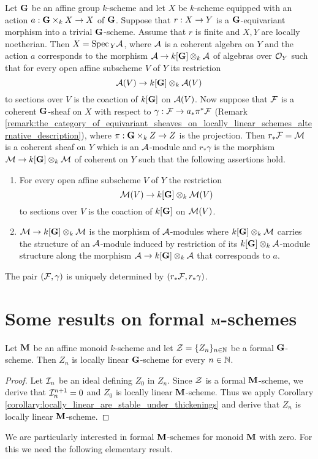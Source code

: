 \begin{remark}\label{remark:equivariant_scheme_affine_over_trivial_scheme}
Let $\mathbf{G}$ be an affine group $k$-scheme and let $X$ be $k$-scheme equipped with an action $a:\mathbf{G}\times_k X\rightarrow X$ of $\mathbf{G}$. Suppose that $r:X\rightarrow Y$ is a $\mathbf{G}$-equivariant morphism into a trivial $\mathbf{G}$-scheme. Assume that $r$ is finite and $X,Y$ are locally noetherian. Then $X = \mathrm{Spec}\,_Y{\mathcal A}$, where ${\mathcal A}$ is a coherent algebra on $Y$ and the action $a$ corresponds to the morphism ${\mathcal A}\rightarrow k[\mathbf{G}]\otimes_k{\mathcal A}$ of algebras over ${\mathcal O}_Y$ such that for every open affine subscheme $V$ of $Y$ its restriction
$${\mathcal A}(V) \rightarrow k[\mathbf{G}]\otimes_k{\mathcal A}(V)$$
to sections over $V$ is the coaction of $k[\mathbf{G}]$ on ${\mathcal A}(V)$. Now suppose that ${\mathcal F}$ is a coherent $\mathbf{G}$-sheaf on $X$ with respect to $\gamma:{\mathcal F}\rightarrow a_*\pi^*{\mathcal F}$ (Remark \ref{remark:the_category_of_equivariant_sheaves_on_locally_linear_schemes_alternative_description}), where $\pi:\mathbf{G}\times_kZ\rightarrow Z$ is the projection. Then $r_*{\mathcal F} = {\mathcal M}$ is a coherent sheaf on $Y$ which is an ${\mathcal A}$-module and $r_*\gamma$ is the morphism ${\mathcal M}\rightarrow k[\mathbf{G}]\otimes_k{\mathcal M}$ of coherent on $Y$ such that the following assertions hold.
\begin{enumerate}[label=\textbf{(\arabic*)}, leftmargin=3.0em]
\item For every open affine subscheme $V$ of $Y$ the restriction
$${\mathcal M}(V) \rightarrow k[\mathbf{G}]\otimes_k{\mathcal M}(V)$$
to sections over $V$ is the coaction of $k[\mathbf{G}]$ on ${\mathcal M}(V)$.
\item ${\mathcal M} \rightarrow k[\mathbf{G}]\otimes_k{\mathcal M}$ is the morphism of ${\mathcal A}$-modules where $k[\mathbf{G}]\otimes_k{\mathcal M}$ carries the structure of an ${\mathcal A}$-module induced by restriction of its $k[\mathbf{G}]\otimes_k{\mathcal A}$-module structure along the morphism ${\mathcal A}\rightarrow k[\mathbf{G}]\otimes_k{\mathcal A}$ that corresponds to $a$.
\end{enumerate}
The pair $({\mathcal F},\gamma)$ is uniquely determined by $(r_*{\mathcal F},r_*\gamma)$.
\end{remark}

\section{Some results on formal $\mathbf{M}$-schemes}

\begin{corollary}\label{corollary:each_formal_scheme_consists_of_locally_linear_schemes_if_group_is_affine}
Let $\mathbf{M}$ be an affine monoid $k$-scheme and let ${\mathcal Z} = \{Z_n\}_{n\in {\mathbb N}}$ be a formal $\mathbf{G}$-scheme. Then $Z_n$ is locally linear $\mathbf{G}$-scheme for every $n\in {\mathbb N}$.
\end{corollary}
\begin{proof}
Let ${\mathcal I}_n$ be an ideal defining $Z_0$ in $Z_n$. Since ${\mathcal Z}$ is a formal $\mathbf{M}$-scheme, we derive that ${\mathcal I}_n^{n+1} = 0$ and $Z_0$ is locally linear $\mathbf{M}$-scheme. Thus we apply Corollary \ref{corollary:locally_linear_are_stable_under_thickenings} and derive that $Z_n$ is locally linear $\mathbf{M}$-scheme.
\end{proof}
\noindent
We are particularly interested in formal $\mathbf{M}$-schemes for monoid $\mathbf{M}$ with zero. For this we need the following elementary result.

